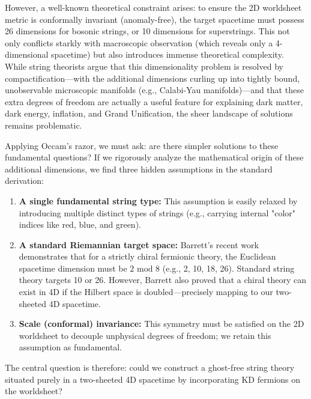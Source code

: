 However, a well-known theoretical constraint arises: to ensure the 2D worldsheet metric is conformally invariant (anomaly-free), the target spacetime must possess 26 dimensions for bosonic strings, or 10 dimensions for superstrings. This not only conflicts starkly with macroscopic observation (which reveals only a 4-dimensional spacetime) but also introduces immense theoretical complexity. While string theorists argue that this dimensionality problem is resolved by compactification—with the additional dimensions curling up into tightly bound, unobservable microscopic manifolds (e.g., Calabi-Yau manifolds)—and that these extra degrees of freedom are actually a useful feature for explaining dark matter, dark energy, inflation, and Grand Unification, the sheer landscape of solutions remains problematic.

Applying Occam's razor, we must ask: are there simpler solutions to these fundamental questions? If we rigorously analyze the mathematical origin of these additional dimensions, we find three hidden assumptions in the standard derivation:
\begin{enumerate}
    \item \textbf{A single fundamental string type:} This assumption is easily relaxed by introducing multiple distinct types of strings (e.g., carrying internal "color" indices like red, blue, and green).
    \item \textbf{A standard Riemannian target space:} Barrett's recent work \cite{Barrett2024} demonstrates that for a strictly chiral fermionic theory, the Euclidean spacetime dimension must be $2 \text{ mod } 8$ (e.g., 2, 10, 18, 26). Standard string theory targets 10 or 26. However, Barrett also proved that a chiral theory can exist in 4D if the Hilbert space is doubled—precisely mapping to our two-sheeted 4D spacetime.
    \item \textbf{Scale (conformal) invariance:} This symmetry must be satisfied on the 2D worldsheet to decouple unphysical degrees of freedom; we retain this assumption as fundamental.
\end{enumerate}

The central question is therefore: could we construct a ghost-free string theory situated purely in a two-sheeted 4D spacetime by incorporating KD fermions on the worldsheet? 

